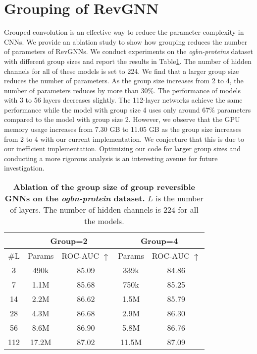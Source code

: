 \documentclass{article}
\newcommand{\tblLabel}{Table\xspace}
\begin{document}



\clearpage
\appendix
\section{Grouping of RevGNN}
Grouped convolution is an effective way to reduce the parameter complexity in CNNs. We provide an ablation study to show how grouping reduces the number of parameters of RevGNNs. We conduct experiments on the \textit{ogbn-proteins} dataset with different group sizes and report the results in \tblLabel \ref{table:group}. The number of hidden channels for all of these models is set to 224. We find that a larger group size reduces the number of parameters. As the group size increases from 2 to 4, the number of parameters reduces by more than 30\%. The performance of models with 3 to 56 layers decreases slightly. The 112-layer networks achieve the same performance while the model with group size 4 uses only around 67\% parameters compared to the model with group size 2. However, we observe that the GPU memory usage increases from 7.30 GB to 11.05 GB as the group size increases from 2 to 4 with our current implementation. We conjecture that this is due to our inefficient implementation. Optimizing our code for larger group sizes and conducting a more rigorous analysis is an interesting avenue for future investigation.

\begin{table}[ht]
\vspace{-8pt}
\centering
\setlength{\tabcolsep}{5pt}
\caption{\textbf{Ablation of the group size of group reversible GNNs on the \textit{ogbn-protein} dataset.} $L$ is the number of layers. The number of hidden channels is 224 for all the models.}
\vspace{2pt}
\begin{tabular}{c|cc|cc}
\toprule
  \label{table:group}
  \centering
  &  \multicolumn{2}{c|}{Group=2} & \multicolumn{2}{c}{Group=4} \\
\midrule
\#L & Params & ROC-AUC $\uparrow$ & Params & ROC-AUC $\uparrow$\\
\midrule
3 & 490k & 85.09 & 339k & 84.86 \\
7 & 1.1M & 85.68 & 750k & 85.25 \\
14 & 2.2M & 86.62 & 1.5M & 85.79 \\
28 & 4.3M & 86.68 & 2.9M & 86.30 \\
56 & 8.6M & 86.90 & 5.8M & 86.76 \\
112 & 17.2M & 87.02 & 11.5M & 87.09 \\
\bottomrule
\end{tabular}
\end{table}
\end{document}
